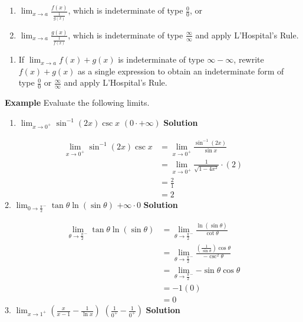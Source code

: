 \documentclass[
  letterpaper,
  DIV=11,
  numbers=noendperiod]{scrartcl}
\providecommand{\tightlist}{%
  \setlength{\itemsep}{0pt}\setlength{\parskip}{0pt}}\usepackage{longtable,booktabs,array}
\begin{document}
\begin{enumerate}
\def\labelenumi{(\alph{enumi})}
\tightlist
\item
  \(\displaystyle\lim_{x\to a}{\frac{f(x)}{\frac{1}{g(x)}}}\), which is
  indeterminate of type \(\frac{0}{0}\), or
\item
  \(\displaystyle\lim_{x\to a}{\frac{g(x)}{\frac{1}{f(x)}}}\), which is
  indeterminate of type \(\frac{\infty}{\infty}\) and apply L'Hospital's
  Rule.
\end{enumerate}

\begin{enumerate}
\def\labelenumi{\arabic{enumi}.}
\setcounter{enumi}{1}
\tightlist
\item
  If \(\displaystyle\lim_{x\to a}{f(x)+g(x)}\) is indeterminate of type
  \(\infty - \infty\), rewrite \(f(x)+g(x)\) as a single expression to
  obtain an indeterminate form of type \(\frac{0}{0}\) or
  \(\frac{\infty}{\infty}\) and apply L'Hospital's Rule.
\end{enumerate}

\leavevmode{}%
\textbf{Example} Evaluate the following limits.

\begin{enumerate}
\def\labelenumi{\arabic{enumi}.}
\tightlist
\item
  \(\displaystyle\lim_{x\to 0^+}{\sin^{-1} (2x) \csc x}\)
  \((0\cdot +\infty)\) \textbf{Solution}
\end{enumerate}

\[
\begin{aligned}
\displaystyle\lim_{x\to 0^+}{\sin^{-1} (2x) \csc x} &=\displaystyle\lim_{x\to 0^+}{\frac{\sin^{-1} (2x)}{\sin x}}\\&=\displaystyle\lim_{x\to 0^+}{\frac{1}{\sqrt{1-4x^2}}}\cdot (2) \\&=\frac{2}{1}\\&=2
\end{aligned}
\] 2.
\(\displaystyle\lim_{0\to \frac{\pi}{2}^-}{\tan \theta \ln (\sin \theta)}\)
\(+\infty \cdot 0\) \textbf{Solution}

\[
\begin{aligned}
\displaystyle\lim_{\theta\to \frac{\pi}{2}^-}{\tan \theta \ln (\sin \theta)}&=\displaystyle\lim_{\theta \to \frac{\pi}{2}^-}{\frac {\ln (\sin \theta)}{\cot \theta}}\\&=\displaystyle\lim_{\theta\to \frac{\pi}{2}^-}{\frac{\left(\frac {1}{\sin \theta}\right)\cos \theta}{-\csc^2 \theta}}\\&=\displaystyle\lim_{\theta\to \frac{\pi}{2}^-}{-\sin \theta\cos \theta}\\&=-1(0)\\&=0
\end{aligned}
\] 3.
\(\displaystyle\lim_{x\to 1^+}{\left(\frac{x}{x-1}-\frac{1}{\ln x}\right)}\)
\(\left(\frac{1}{0^+}-\frac{1}{0^+}\right)\) \textbf{Solution}
\end{document}
